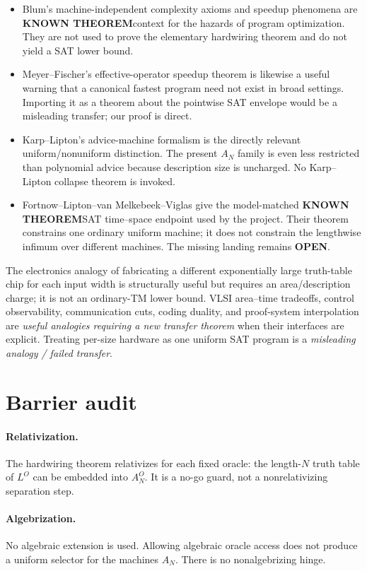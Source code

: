 \documentclass[11pt]{article}
\newcommand{\KNOWN}{\textbf{KNOWN THEOREM}}
\newcommand{\OPEN}{\textbf{OPEN}}
\begin{document}
\begin{itemize}
\item Blum's machine-independent complexity axioms and speedup phenomena are
\KNOWN context for the hazards of program optimization.  They are not used
to prove the elementary hardwiring theorem and do not yield a SAT lower bound.
\item Meyer--Fischer's effective-operator speedup theorem is likewise a
useful warning that a canonical fastest program need not exist in broad
settings.  Importing it as a theorem about the pointwise SAT envelope would
be a misleading transfer; our proof is direct.
\item Karp--Lipton's advice-machine formalism is the directly relevant
uniform/nonuniform distinction.  The present \(A_N\) family is even less
restricted than polynomial advice because description size is uncharged.
No Karp--Lipton collapse theorem is invoked.
\item Fortnow--Lipton--van Melkebeek--Viglas give the model-matched
\KNOWN SAT time--space endpoint used by the project.  Their theorem constrains
one ordinary uniform machine; it does not constrain the lengthwise infimum
over different machines.  The missing landing remains \OPEN.
\end{itemize}

The electronics analogy of fabricating a different exponentially large
truth-table chip for each input width is structurally useful but requires an
area/description charge; it is not an ordinary-TM lower bound.  VLSI
area--time tradeoffs, control observability, communication cuts, coding
duality, and proof-system interpolation are \emph{useful analogies requiring
a new transfer theorem} when their interfaces are explicit.  Treating
per-size hardware as one uniform SAT program is a \emph{misleading analogy / 
failed transfer}.

\section{Barrier audit}

\paragraph{Relativization.}
The hardwiring theorem relativizes for each fixed oracle: the length-\(N\)
truth table of \(L^O\) can be embedded into \(A_N^O\).  It is a no-go guard,
not a nonrelativizing separation step.

\paragraph{Algebrization.}
No algebraic extension is used.  Allowing algebraic oracle access does not
produce a uniform selector for the machines \(A_N\).  There is no
nonalgebrizing hinge.
\end{document}
